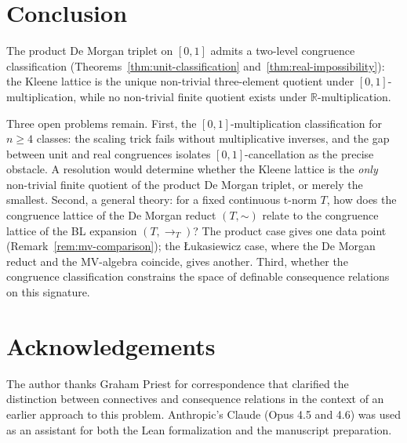 \documentclass[11pt,a4paper]{article}
\newcommand{\negc}{\mathord{\sim}}
\begin{document}
\section{Conclusion}
\label{sec:conclusion}

The product De Morgan triplet on $[0,1]$ admits a two-level
congruence classification
(Theorems~\ref{thm:unit-classification}
and~\ref{thm:real-impossibility}): the Kleene lattice is the unique
non-trivial three-element quotient under $[0,1]$-multiplication, while
no non-trivial finite quotient exists under
$\mathbb{R}$-multiplication.

Three open problems remain.
First, the $[0,1]$-multiplication classification for $n \geq 4$
classes: the scaling trick fails without multiplicative inverses, and
the gap between unit and real congruences isolates $[0,1]$-cancellation
as the precise obstacle.
A resolution would determine whether the Kleene lattice is the
\emph{only} non-trivial finite quotient of the product De Morgan
triplet, or merely the smallest.
Second, a general theory: for a fixed continuous t-norm $T$, how does
the congruence lattice of the De Morgan reduct $(T, \negc)$ relate to
the congruence lattice of the BL expansion $(T, \to_T)$?
The product case gives one data point (Remark~\ref{rem:mv-comparison});
the \L ukasiewicz case, where the De Morgan reduct and the MV-algebra
coincide, gives another.
Third, whether the congruence classification constrains the space of
definable consequence relations on this signature.

\section*{Acknowledgements}

The author thanks Graham Priest for correspondence that clarified the
distinction between connectives and consequence relations in the context of
an earlier approach to this problem.
Anthropic's Claude (Opus 4.5 and 4.6) was used as an assistant for both
the Lean formalization and the manuscript preparation.




\end{document}
